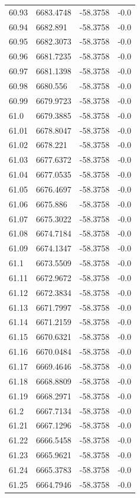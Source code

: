 \begin{table}[H]
\begin{tabular}{llll}
60.93 & 6683.4748 & -58.3758 & -0.0 \\
60.94 & 6682.891 & -58.3758 & -0.0 \\
60.95 & 6682.3073 & -58.3758 & -0.0 \\
60.96 & 6681.7235 & -58.3758 & -0.0 \\
60.97 & 6681.1398 & -58.3758 & -0.0 \\
60.98 & 6680.556 & -58.3758 & -0.0 \\
60.99 & 6679.9723 & -58.3758 & -0.0 \\
61.0 & 6679.3885 & -58.3758 & -0.0 \\
61.01 & 6678.8047 & -58.3758 & -0.0 \\
61.02 & 6678.221 & -58.3758 & -0.0 \\
61.03 & 6677.6372 & -58.3758 & -0.0 \\
61.04 & 6677.0535 & -58.3758 & -0.0 \\
61.05 & 6676.4697 & -58.3758 & -0.0 \\
61.06 & 6675.886 & -58.3758 & -0.0 \\
61.07 & 6675.3022 & -58.3758 & -0.0 \\
61.08 & 6674.7184 & -58.3758 & -0.0 \\
61.09 & 6674.1347 & -58.3758 & -0.0 \\
61.1 & 6673.5509 & -58.3758 & -0.0 \\
61.11 & 6672.9672 & -58.3758 & -0.0 \\
61.12 & 6672.3834 & -58.3758 & -0.0 \\
61.13 & 6671.7997 & -58.3758 & -0.0 \\
61.14 & 6671.2159 & -58.3758 & -0.0 \\
61.15 & 6670.6321 & -58.3758 & -0.0 \\
61.16 & 6670.0484 & -58.3758 & -0.0 \\
61.17 & 6669.4646 & -58.3758 & -0.0 \\
61.18 & 6668.8809 & -58.3758 & -0.0 \\
61.19 & 6668.2971 & -58.3758 & -0.0 \\
61.2 & 6667.7134 & -58.3758 & -0.0 \\
61.21 & 6667.1296 & -58.3758 & -0.0 \\
61.22 & 6666.5458 & -58.3758 & -0.0 \\
61.23 & 6665.9621 & -58.3758 & -0.0 \\
61.24 & 6665.3783 & -58.3758 & -0.0 \\
61.25 & 6664.7946 & -58.3758 & -0.0 \\

\end{tabular}
\end{table}
